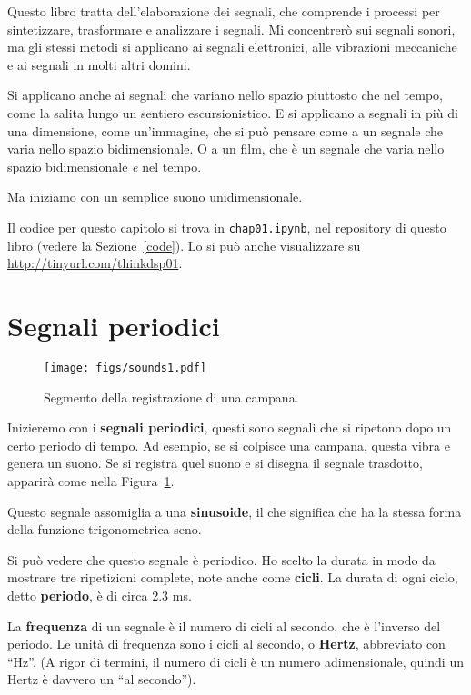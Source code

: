 \documentclass[12pt,a4paper]{book}
\begin{document}
Questo libro tratta dell'elaborazione dei segnali, che comprende i processi per sintetizzare, trasformare e analizzare i segnali. Mi concentrerò sui segnali sonori, ma gli stessi metodi si applicano ai segnali elettronici, alle vibrazioni meccaniche e ai segnali in molti altri domini.

Si applicano anche ai segnali che variano nello spazio piuttosto che nel tempo, come la salita lungo un sentiero escursionistico. E si applicano a segnali in più di una dimensione, come un'immagine, che si può pensare come a un segnale che varia nello spazio bidimensionale. O a un film, che è un segnale che varia nello spazio bidimensionale {\it e} nel tempo.

Ma iniziamo con un semplice suono unidimensionale.

Il codice per questo capitolo si trova in {\tt chap01.ipynb}, nel repository di questo libro (vedere la Sezione~\ref{code}). Lo si può anche visualizzare su \url{http://tinyurl.com/thinkdsp01}.

\section{Segnali periodici} \label{violin} 

\begin{figure} 

\centerline{\texttt{[image: figs/sounds1.pdf]}} \caption{Segmento della registrazione di una campana.} \label{fig.sounds1} \end{figure} 

Inizieremo con i {\bf segnali periodici}, questi sono segnali che si ripetono dopo un certo periodo di tempo. Ad esempio, se si colpisce una campana, questa vibra e genera un suono. Se si registra quel suono e si disegna il segnale trasdotto, apparirà come nella Figura~\ref{fig.sounds1}.

Questo segnale assomiglia a una {\bf sinusoide}, il che significa che ha la stessa forma della funzione trigonometrica seno.

Si può vedere che questo segnale è periodico. Ho scelto la durata in modo da mostrare tre ripetizioni complete, note anche come {\bf cicli}. La durata di ogni ciclo, detto {\bf periodo}, è di circa 2.3 ms.

La {\bf frequenza} di un segnale è il numero di cicli al secondo, che è l'inverso del periodo. Le unità di frequenza sono i cicli al secondo, o {\bf Hertz}, abbreviato con ``Hz''. (A rigor di termini, il numero di cicli è un numero adimensionale, quindi un Hertz è davvero un ``al secondo'').
\end{document}
